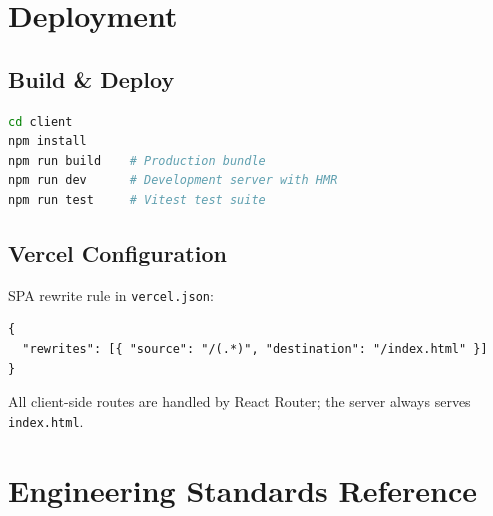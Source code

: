 \documentclass[12pt, a4paper, oneside]{report}
\newcommand{\file}[1]{\texttt{\textcolor{codeblue}{#1}}}
\newcommand{\code}[1]{\texttt{\textcolor{codered}{#1}}}
\begin{document}
\chapter{Deployment}

\section{Build \& Deploy}

\begin{lstlisting}[language=bash, caption={Build Commands}]
cd client
npm install
npm run build    # Production bundle
npm run dev      # Development server with HMR
npm run test     # Vitest test suite
\end{lstlisting}

\section{Vercel Configuration}

SPA rewrite rule in \file{vercel.json}:
\begin{lstlisting}[language={}, caption={Vercel Rewrite Rule}]
{
  "rewrites": [{ "source": "/(.*)", "destination": "/index.html" }]
}
\end{lstlisting}

All client-side routes are handled by React Router; the server always serves \code{index.html}.


\chapter{Engineering Standards Reference}
\end{document}
